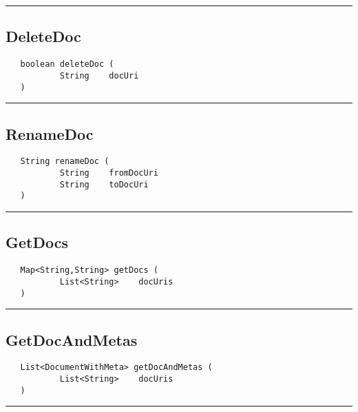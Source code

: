 \rule{15cm}{2pt}
\subsection{DeleteDoc}
\label{Api:DeleteDoc}
\begin{verbatim}
   boolean deleteDoc (
           String    docUri
   )
\end{verbatim}



\rule{15cm}{2pt}
\subsection{RenameDoc}
\label{Api:RenameDoc}
\begin{verbatim}
   String renameDoc (
           String    fromDocUri
           String    toDocUri
   )
\end{verbatim}



\rule{15cm}{2pt}
\subsection{GetDocs}
\label{Api:GetDocs}
\begin{verbatim}
   Map<String,String> getDocs (
           List<String>    docUris
   )
\end{verbatim}



\rule{15cm}{2pt}
\subsection{GetDocAndMetas}
\label{Api:GetDocAndMetas}
\begin{verbatim}
   List<DocumentWithMeta> getDocAndMetas (
           List<String>    docUris
   )
\end{verbatim}



\rule{15cm}{2pt}
